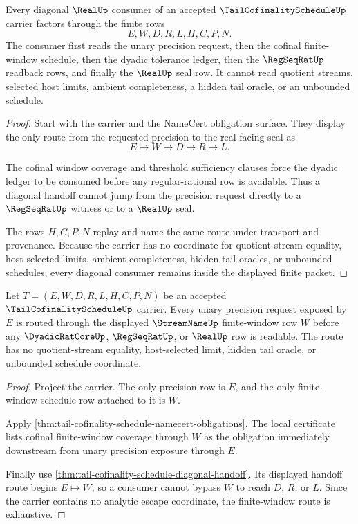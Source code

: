 \begin{theorem}
\label{thm:tail-cofinality-schedule-diagonal-handoff}
Every diagonal $\RealUp$ consumer of an accepted $\TailCofinalityScheduleUp$ carrier factors through the finite rows
$$
E,W,D,R,L,H,C,P,N.
$$
The consumer first reads the unary precision request, then the cofinal finite-window schedule, then the dyadic tolerance ledger, then the $\RegSeqRatUp$ readback rows, and finally the $\RealUp$ seal row. It cannot read quotient streams, selected host limits, ambient completeness, a hidden tail oracle, or an unbounded schedule.
\end{theorem}
\begin{proof}
Start with the carrier and the NameCert obligation surface. They display the only route from the requested precision to the real-facing seal as
$$
E \longmapsto W \longmapsto D \longmapsto R \longmapsto L.
$$

The cofinal window coverage and threshold sufficiency clauses force the dyadic ledger to be consumed before any regular-rational row is available. Thus a diagonal handoff cannot jump from the precision request directly to a $\RegSeqRatUp$ witness or to a $\RealUp$ seal.

The rows $H,C,P,N$ replay and name the same route under transport and provenance. Because the carrier has no coordinate for quotient stream equality, host-selected limits, ambient completeness, hidden tail oracles, or unbounded schedules, every diagonal consumer remains inside the displayed finite packet.
\end{proof}

\begin{theorem}
\label{thm:tail-cofinality-schedule-window-coverage}
Let $T=(E,W,D,R,L,H,C,P,N)$ be an accepted $\TailCofinalityScheduleUp$ carrier. Every unary precision request exposed by $E$ is routed through the displayed $\StreamNameUp$ finite-window row $W$ before any $\DyadicRatCoreUp$, $\RegSeqRatUp$, or $\RealUp$ row is readable. The route has no quotient-stream equality, host-selected limit, hidden tail oracle, or unbounded schedule coordinate.
\end{theorem}
\begin{proof}
Project the carrier. The only precision row is $E$, and the only finite-window schedule row attached to it is $W$.

Apply \autoref{thm:tail-cofinality-schedule-namecert-obligations}. The local certificate lists cofinal finite-window coverage through $W$ as the obligation immediately downstream from unary precision exposure through $E$.

Finally use \autoref{thm:tail-cofinality-schedule-diagonal-handoff}. Its displayed handoff route begins $E \longmapsto W$, so a consumer cannot bypass $W$ to reach $D$, $R$, or $L$. Since the carrier contains no analytic escape coordinate, the finite-window route is exhaustive.
\end{proof}

